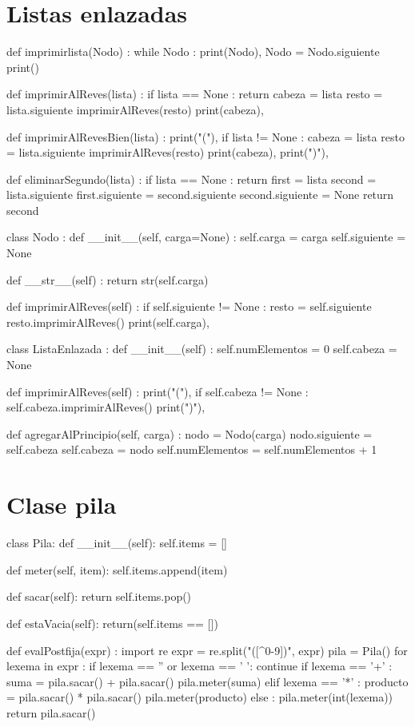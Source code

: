\section{Listas enlazadas}

\begin{pythoncode}
def imprimirlista(Nodo) :
  while Nodo :
    print(Nodo),
    Nodo = Nodo.siguiente
  print()

def imprimirAlReves(lista) :
  if lista == None : 
      return
  cabeza = lista
  resto = lista.siguiente
  imprimirAlReves(resto)
  print(cabeza),

def imprimirAlRevesBien(lista) :
  print("("),
  if lista != None :
    cabeza = lista
    resto = lista.siguiente
    imprimirAlReves(resto)
    print(cabeza),
  print(")"),

def eliminarSegundo(lista) :
  if lista == None : return
  first  = lista
  second = lista.siguiente
  first.siguiente = second.siguiente
  second.siguiente = None
  return second

class Nodo :
  def __init__(self, carga=None) :
    self.carga = carga
    self.siguiente  = None

  def __str__(self) :
    return str(self.carga)

  def imprimirAlReves(self) :
    if self.siguiente != None :
      resto = self.siguiente
      resto.imprimirAlReves()
    print(self.carga),

class ListaEnlazada :
  def __init__(self) :
    self.numElementos = 0
    self.cabeza   = None

  def imprimirAlReves(self) :
    print("("),
    if self.cabeza != None :
      self.cabeza.imprimirAlReves()
    print(")"),

  def agregarAlPrincipio(self, carga) :
    nodo = Nodo(carga)
    nodo.siguiente = self.cabeza
    self.cabeza = nodo
    self.numElementos = self.numElementos + 1
\end{pythoncode}

\section{Clase pila}

\begin{pythoncode}
class Pila:              
  def __init__(self):
    self.items = []

  def meter(self, item):
    self.items.append(item)

  def sacar(self):
    return self.items.pop()

  def estaVacia(self):
    return(self.items == [])

def evalPostfija(expr) :
  import re
  expr = re.split("([^0-9])", expr)
  pila = Pila()
  for lexema in expr :
    if  lexema == '' or lexema == ' ':
      continue
    if  lexema == '+' :
      suma = pila.sacar() + pila.sacar()
      pila.meter(suma)
    elif lexema == '*' :
      producto = pila.sacar() * pila.sacar()
      pila.meter(producto)
    else :
      pila.meter(int(lexema))
  return pila.sacar()
\end{pythoncode}


